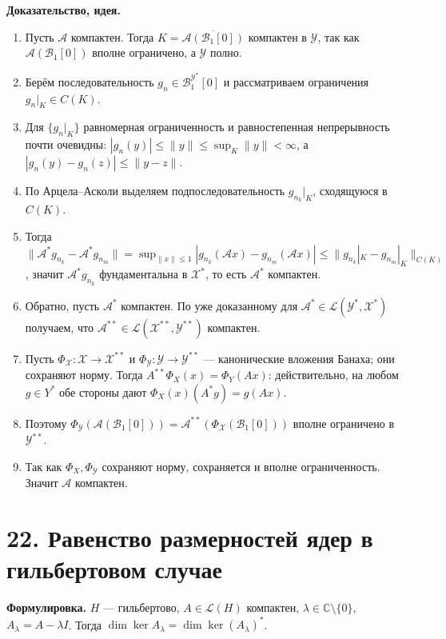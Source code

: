 \documentclass[10pt,a4paper]{article}
\begin{document}
	\textbf{Доказательство, идея.}
	\begin{enumerate}
		\item Пусть $\mathcal A$ компактен. Тогда $K=\overline{\mathcal A(\mathcal B_1[0])}$ компактен в $\mathcal Y$, так как $\mathcal A(\mathcal B_1[0])$ вполне ограничено, а $\mathcal Y$ полно.

		\item Берём последовательность $g_n\in \mathcal B_1^{\mathcal Y^*}[0]$ и рассматриваем ограничения $g_n|_K\in C(K)$.

		\item Для $\{g_n|_K\}$ равномерная ограниченность и равностепенная непрерывность почти очевидны: $|g_n(y)|\le\|y\|\le \sup_K\|y\|<\infty$, а $|g_n(y)-g_n(z)|\le \|y-z\|$.

		\item По Арцела--Асколи выделяем подпоследовательность $g_{n_k}|_K$, сходящуюся в $C(K)$.

		\item Тогда $\|\mathcal A^*g_{n_k}-\mathcal A^*g_{n_m}\|=\sup_{\|x\|\le1}|g_{n_k}(\mathcal A x)-g_{n_m}(\mathcal A x)|\le \|g_{n_k}|_K-g_{n_m}|_K\|_{C(K)}$, значит $\mathcal A^*g_{n_k}$ фундаментальна в $\mathcal X^*$, то есть $\mathcal A^*$ компактен.

		\item Обратно, пусть $\mathcal A^*$ компактен. По уже доказанному для $\mathcal A^*\in\mathcal L(\mathcal Y^*,\mathcal X^*)$ получаем, что $\mathcal A^{**}\in\mathcal L(\mathcal X^{**},\mathcal Y^{**})$ компактен.

		\item Пусть $\Phi_{\mathcal X}:\mathcal X\to\mathcal X^{**}$ и $\Phi_{\mathcal Y}:\mathcal Y\to\mathcal Y^{**}$ --- канонические вложения Банаха; они сохраняют норму. Тогда $A^{**}\Phi_X(x)=\Phi_Y(Ax)$: действительно, на любом $g\in Y^\ast$ обе стороны дают $\Phi_X(x)(A^\ast g)=g(Ax)$.

		\item Поэтому $\Phi_{\mathcal Y}(\mathcal A(\mathcal B_1[0]))=\mathcal A^{**}(\Phi_{\mathcal X}(\mathcal B_1[0]))$ вполне ограничено в $\mathcal Y^{**}$.

		\item Так как $\Phi_X,\Phi_{\mathcal Y}$ сохраняют норму, сохраняется и вполне ограниченность. Значит $\mathcal A$ компактен.
	\end{enumerate}

	\section*{22. Равенство размерностей ядер в гильбертовом случае}
	\textbf{Формулировка.} $H$ --- гильбертово, $A\in\mathcal L(H)$ компактен, $\lambda\in\mathbb C\setminus\{0\}$, $A_\lambda=A-\lambda I$. Тогда $\dim\ker A_\lambda=\dim\ker(A_\lambda)^*$.
\end{document}
